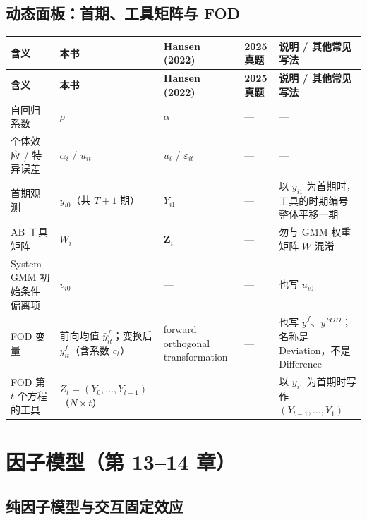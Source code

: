 \subsection{动态面板：首期、工具矩阵与 FOD}

{\renewcommand{\arraystretch}{1.15}\begin{longtable}{@{}>{\raggedright\arraybackslash\small}p{2.3cm}>{\raggedright\arraybackslash\small}p{3.7cm}>{\raggedright\arraybackslash\small}p{3.0cm}>{\raggedright\arraybackslash\small}p{2.2cm}>{\raggedright\arraybackslash\small}p{3.4cm}@{}}
\toprule
\textbf{含义} & \textbf{本书} & \textbf{Hansen (2022)} & \textbf{2025 真题} & \textbf{说明 / 其他常见写法}\\
\midrule
\endfirsthead
\toprule
\textbf{含义} & \textbf{本书} & \textbf{Hansen (2022)} & \textbf{2025 真题} & \textbf{说明 / 其他常见写法}\\
\midrule
\endhead
\bottomrule
\endlastfoot
自回归系数 & $\rho$ & $\alpha$ & — & —\\
\addlinespace[1pt]
个体效应 / 特异误差 & $\alpha_i$ / $u_{it}$ & $u_i$ / $\varepsilon_{it}$ & — & —\\
\addlinespace[1pt]
首期观测 & $y_{i0}$（共 $T+1$ 期） & $Y_{i1}$ & — & 以 $y_{i1}$ 为首期时，工具的时期编号整体平移一期\\
\addlinespace[1pt]
AB 工具矩阵 & $W_i$ & $\bm Z_i$ & — & 勿与 GMM 权重矩阵 $W$ 混淆\\
\addlinespace[1pt]
System GMM 初始条件偏离项 & $v_{i0}$ & — & — & 也写 $u_{i0}$\\
\addlinespace[1pt]
FOD 变量 & 前向均值 $\bar y^f_{it}$；变换后 $y^f_{it}$（含系数 $c_t$） & forward orthogonal transformation & — & 也写 $\tilde y^f$、$y^{FOD}$；名称是 Deviation，不是 Difference\\
\addlinespace[1pt]
FOD 第 $t$ 个方程的工具 & $Z_t=(Y_0,\dots,Y_{t-1})$（$N\times t$） & — & — & 以 $y_{i1}$ 为首期时写作 $(Y_{t-1},\dots,Y_1)$\\
\end{longtable}}


\section{因子模型（第 13–14 章）}\label{sec:UappD-factor}

\subsection{纯因子模型与交互固定效应}

